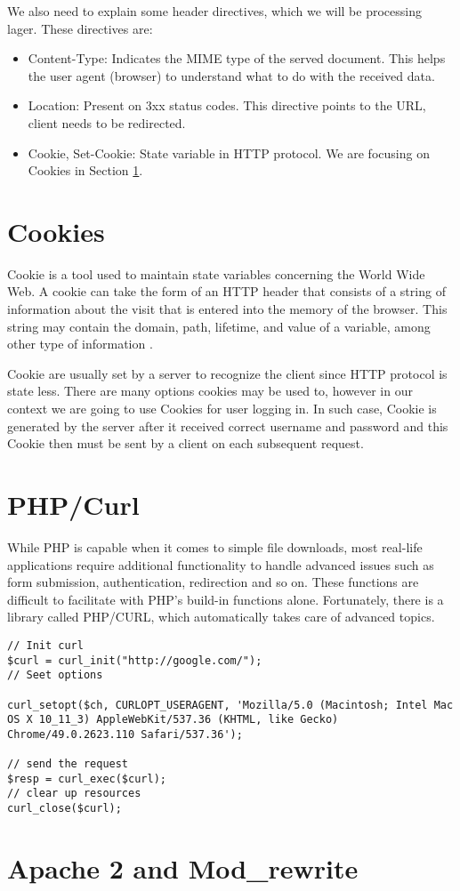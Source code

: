 We also need to explain some header directives, which we will be processing lager. These directives are:

\begin{itemize}
\item Content-Type: Indicates the MIME type of the served document. This helps the user agent (browser) to understand what to do with the received data. \cite{mozzila}
\item Location: Present on 3xx status codes. This directive points to the URL, client needs to be redirected.
\item Cookie, Set-Cookie: State variable in HTTP protocol. We are focusing on Cookies in Section \ref{sec:cookies}.
\end{itemize}


\section{Cookies}
\label{sec:cookies}
Cookie is a tool used to maintain state variables concerning the World Wide Web. A cookie can take the form of an HTTP header that consists of a string of information about the visit that is entered into the memory of the browser. This string may contain the domain, path, lifetime, and value of a variable, among other type of information \cite{reiche2000http}.

Cookie are usually set by a server to recognize the client since HTTP protocol is state less. There are many options cookies may be used to, however in our context we are going to use Cookies for user logging in. In such case, Cookie is generated by the server after it received correct username and password and this Cookie then must be sent by a client on each subsequent request.


\section{PHP/Curl}
While PHP is capable when it comes to simple file downloads, most real-life applications require additional functionality to handle advanced issues such as form submission, authentication, redirection and so on. These functions are difficult to facilitate with PHP's build-in functions alone. Fortunately, there is a library called PHP/CURL, which automatically takes care of advanced topics.  \cite{curl} 

\begin{lstlisting}[caption={Example of PHP/Curl usage},label={lst:phpcurl}]
// Init curl
$curl = curl_init("http://google.com/");
// Seet options

curl_setopt($ch, CURLOPT_USERAGENT, 'Mozilla/5.0 (Macintosh; Intel Mac OS X 10_11_3) AppleWebKit/537.36 (KHTML, like Gecko) Chrome/49.0.2623.110 Safari/537.36');

// send the request
$resp = curl_exec($curl);
// clear up resources
curl_close($curl);
\end{lstlisting}
\section{Apache 2 and Mod\_rewrite}






















